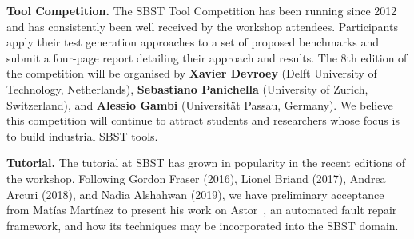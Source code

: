 \documentclass[sigconf,review]{acmart}
\begin{document}
\vspace{1mm} \noindent
{\bf Tool Competition.} The SBST Tool Competition has been running
since 2012 and has consistently been well received by the workshop
attendees. Participants apply their test generation approaches to a
set of proposed benchmarks and submit a four-page report detailing
their approach and results. The 8th edition of the competition will be
organised by {\bf Xavier Devroey} (Delft University of Technology, Netherlands),
{\bf Sebastiano Panichella} (University of Zurich, Switzerland),
and {\bf Alessio Gambi} (Universit{\"a}t Passau, Germany). We
believe this competition will continue to attract students and
researchers whose focus is to build industrial SBST tools.

{\bf Tutorial.} The tutorial at SBST has grown in popularity in the
recent editions of the workshop. Following Gordon Fraser (2016),
Lionel Briand (2017), Andrea Arcuri (2018), and Nadia Alshahwan (2019), 
we have preliminary acceptance from Matías Martínez to present his work on 
Astor~\cite{Astor}, an automated fault repair framework, and how its techniques may be incorporated
into the SBST domain.


\end{document}
